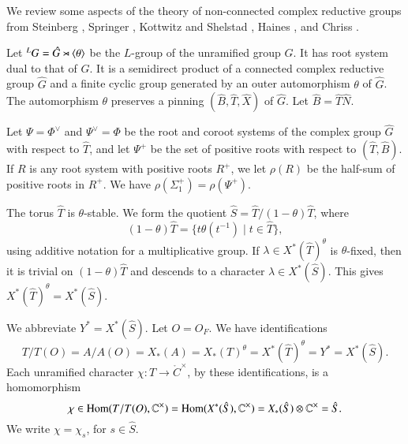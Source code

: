 
We review some aspects of the  theory of  non-connected complex reductive groups from
Steinberg \cite{steinberg1968endomorphisms},  Springer \cite{springer2010linear},
Kottwitz and Shelstad \cite{kottwitz1999foundations}, 
Haines \cite{haines2016dualities}, and
 Chriss \cite{chriss}.





Let ${}^LG = \hat G \rtimes \langle{\theta}\rangle$ be the $L$-group of the unramified group $G$.
It has root system dual to that of $G$.
It is a semidirect product of a connected complex reductive group $\hat G$ and a finite cyclic group
generated by an outer automorphism $\theta$ of $\hat G$.  The automorphism $\theta$ 
 preserves a pinning $(\hat B,\hat T,\hat X)$ of $\hat G$. Let $\hat B = \hat T\hat N$.

Let $\Psi=\Phi^\vee$ and $\Psi^\vee=\Phi$ be the root and coroot systems
 of the complex group $\hat G$ with respect to $\hat T$, and let
$\Psi^+$ be the set of positive roots with respect to $(\hat T,\hat B)$.
If $R$ is any root system with positive roots $R^+$, we let $\rho(R)$ be the half-sum
of positive roots in $R^+$.  We have $\rho(\Sigma^+_1) = \rho(\Psi^+)$.


The torus $\hat T$ is $\theta$-stable.  We form the quotient 
$\hat S = \hat T/(1-\theta) \hat T$, where
\[
(1-\theta)\hat T = \{ t\theta(t^{-1}) \mid t\in \hat T\},
\]
using additive notation for a multiplicative group.
If $\lambda\in X^*(\hat T)^\theta$ is $\theta$-fixed, then
it is trivial on $(1-\theta)\hat T$ and descends to a character $\lambda\in X^*(\hat S)$.
This gives $X^*(\hat T)^\theta = X^*(\hat S)$.

We abbreviate $Y^* = X^*(\hat S)$. Let $O=O_F$.
We have identifications
\begin{equation}\label{eqn:identify}
T/T(O)=A/A(O)=X_*(A)=X_*(T)^\theta  =X^*(\hat T)^\theta = Y^* = X^*(\hat S).
\end{equation}
Each unramified character $\chi:T\to \ring{C}^\times$, by these identifications, is a homomorphism
\begin{equation}
\chi\in{\operatorname{Hom}}(T/T(O),\mathbb{C}^\times) = {\operatorname{Hom}}(X^*(\hat S),\mathbb{C}^\times) = X_*(\hat S)\otimes \mathbb{C}^\times = \hat S.
\end{equation}
We write $\chi = \chi_s$, for $s\in\hat S$.


